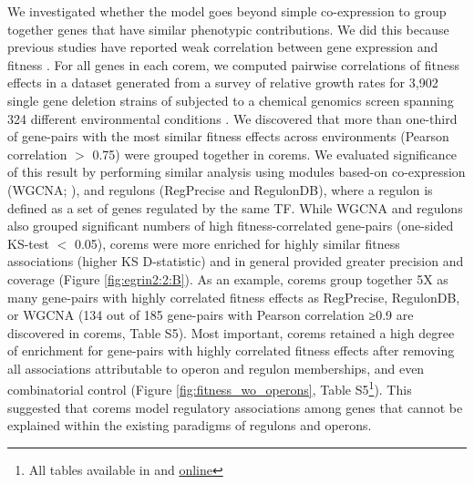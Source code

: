 We investigated whether the model goes beyond simple co-expression to group together genes that have similar phenotypic contributions. We did this because previous studies have reported weak correlation between gene expression and fitness \cite{price_indirect_2013}. For all genes in each corem, we computed pairwise correlations of fitness effects in a dataset generated from a survey of relative growth rates for 3,902 single gene deletion strains of \eco subjected to a chemical genomics screen spanning 324 different environmental conditions \cite{nichols_phenotypic_2011}. We discovered that more than one-third of gene-pairs with the most similar fitness effects across environments (Pearson correlation $>$ 0.75) were grouped together in corems. We evaluated significance of this result by performing similar analysis using modules based-on co-expression (WGCNA; \cite{langfelder_wgcna:_2008}), and regulons (RegPrecise and RegulonDB), where a regulon is defined as a set of genes regulated by the same TF. While WGCNA and regulons also grouped significant numbers of high fitness-correlated gene-pairs (one-sided KS-test $<$ 0.05), corems were more enriched for highly similar fitness associations (higher KS D-statistic) and in general provided greater precision and coverage (Figure \ref{fig:egrin2:2:B}). As an example, corems group together 5X as many gene-pairs with highly correlated fitness effects as RegPrecise, RegulonDB, or WGCNA (134 out of 185 gene-pairs with Pearson correlation ≥0.9 are discovered in corems, Table S5). Most important, corems retained a high degree of enrichment for gene-pairs with highly correlated fitness effects after removing all associations attributable to operon and regulon memberships, and even combinatorial control (Figure \ref{fig:fitness_wo_operons}, Table S5\footnote{All tables available in \cite{brooks_systemlevel_2014} and \href{http://egrin2.systemsbiology.net}{online}}). This suggested that corems model regulatory associations among genes that cannot be explained within the existing paradigms of regulons and operons. 

